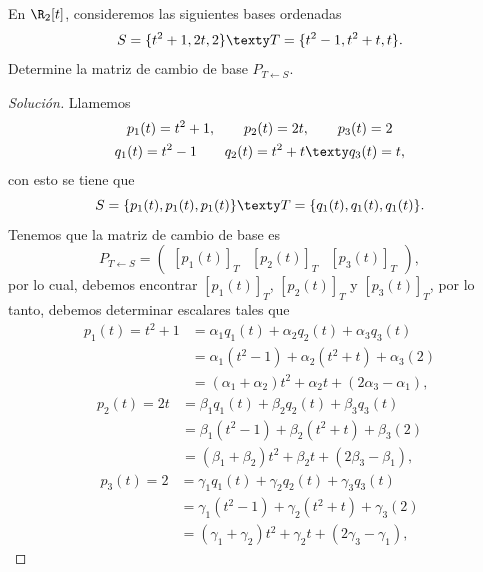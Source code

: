 \documentclass[a4,11pt]{aleph-notas}
\begin{document}
\begin{ejer}
    En $\R_2[t]$, consideremos las siguientes bases ordenadas
    \[
        S = \{t^2+1,2t,2\}
        \texty
        T = \{t^2-1,t^2+t,t\}.
    \]
    Determine la matriz de cambio de base $P_{T \leftarrow S}$.
\end{ejer}


\begin{proof}[Solución]
    Llamemos
    \begin{gather*}
        p_1(t) = t^2+1,\qquad
        p_2(t) = 2t,\qquad
        p_3(t) = 2\\
        q_1(t) = t^2-1\qquad
        q_2(t) = t^2+t\texty
        q_3(t) = t,
    \end{gather*}
    con esto se tiene que
    \[
        S = \{p_1(t),p_1(t),p_1(t)\}
        \texty
        T = \{q_1(t),q_1(t),q_1(t)\}.
    \]
    Tenemos que la matriz de cambio de base es 
    \[
        P_{T\leftarrow S} = 
        \begin{pmatrix}
        [p_1(t)]_T & [p_2(t)]_T & [p_3(t)]_T
        \end{pmatrix},
    \]
    por lo cual, debemos encontrar $[p_1(t)]_T$, $[p_2(t)]_T$ y $[p_3(t)]_T$, por lo tanto, debemos determinar escalares tales que
    \begin{align*}
        p_1(t) = t^2+1
        & = \alpha_1 q_1(t)+\alpha_2q_2(t)+\alpha_3q_3(t) \\
        & = \alpha_1 (t^2-1) +\alpha_2(t^2+t) +\alpha_3(2)\\
        & = (\alpha_1+\alpha_2)t^2+\alpha_2 t+(2\alpha_3-\alpha_1),
    \end{align*}
    \begin{align*}
        p_2(t) = 2t
        & = \beta_1 q_1(t)+\beta_2q_2(t)+\beta_3q_3(t) \\
        & = \beta_1 (t^2-1) +\beta_2(t^2+t) +\beta_3(2)\\
        & = (\beta_1+\beta_2)t^2+\beta_2 t+(2\beta_3-\beta_1),
    \end{align*}
    \begin{align*}
        p_3(t) = 2
        & = \gamma_1 q_1(t)+\gamma_2q_2(t)+\gamma_3q_3(t) \\
        & = \gamma_1 (t^2-1) +\gamma_2(t^2+t) +\gamma_3(2)\\
        & = (\gamma_1+\gamma_2)t^2+\gamma_2 t+(2\gamma_3-\gamma_1),
    \end{align*}

\end{proof}
\end{document}
